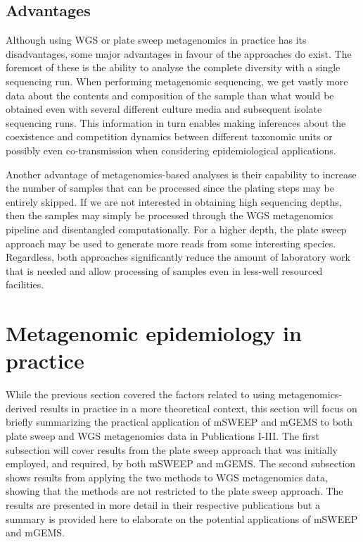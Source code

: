 \documentclass[officiallayout]{tktla}
\begin{document}
\subsection{Advantages}

Although using WGS or plate sweep metagenomics in practice has its
disadvantages, some major advantages in favour of the approaches do
exist. The foremost of these is the ability to analyse the complete
diversity with a single sequencing run. When performing metagenomic
sequencing, we get vastly more data about the contents and composition
of the sample than what would be obtained even with several different
culture media and subsequent isolate sequencing runs. This information
in turn enables making inferences about the coexistence and
competition dynamics between different taxonomic units or possibly
even co-transmission when considering epidemiological applications.

Another advantage of metagenomics-based analyses is their capability
to increase the number of samples that can be processed since the
plating steps may be entirely skipped. If we are not interested in
obtaining high sequencing depths, then the samples may simply be
processed through the WGS metagenomics pipeline and disentangled
computationally. For a higher depth, the plate sweep approach may be
used to generate more reads from some interesting species. Regardless,
both approaches significantly reduce the amount of laboratory work
that is needed and allow processing of samples even in less-well
resourced facilities.

\section{Metagenomic epidemiology in practice}

While the previous section covered the factors related to using
metagenomics-derived results in practice in a more theoretical
context, this section will focus on briefly summarizing the practical
application of mSWEEP and mGEMS to both plate sweep and WGS
metagenomics data in Publications I-III. The first subsection will
cover results from the plate sweep approach that was initially
employed, and required, by both mSWEEP and mGEMS. The second
subsection shows results from applying the two methods to WGS
metagenomics data, showing that the methods are not restricted to the
plate sweep approach. The results are presented in more detail in
their respective publications but a summary is provided here to elaborate on
the potential applications of mSWEEP and mGEMS.
\end{document}
